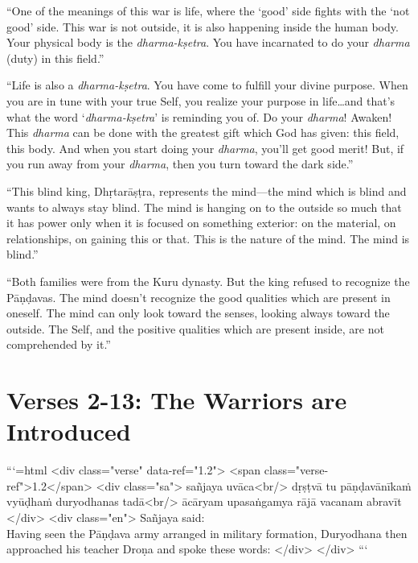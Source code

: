 \enquote{One of the meanings of this war is life, where the \enquote{good} side fights with the \enquote{not good} side. This war is not outside, it is also happening inside the human body. Your physical body is the \textit{dharma-kṣetra}. You have incarnated to do your \textit{dharma} (duty) in this field.}

\enquote{Life is also a \textit{dharma-kṣetra}. You have come to fulfill your divine purpose. When you are in tune with your true Self, you realize your purpose in life\ldots and that’s what the word \enquote{\textit{dharma-kṣetra}} is reminding you of. Do your \textit{dharma}! Awaken! This \textit{dharma} can be done with the greatest gift which God has given: this field, this body. And when you start doing your \textit{dharma}, you’ll get good merit! But, if you run away from your \textit{dharma}, then you turn toward the dark side.}

\enquote{This blind king, Dhṛtarāṣṭra, represents the mind---the mind which is blind and wants to always stay blind. The mind is hanging on to the outside so much that it has power only when it is focused on something exterior: on the material, on relationships, on gaining this or that. This is the nature of the mind. The mind is blind.}

\enquote{Both families were from the Kuru dynasty. But the king refused to recognize the Pāṇḍavas. The mind doesn’t recognize the good qualities which are present in oneself. The mind can only look toward the senses, looking always toward the outside. The Self, and the positive qualities which are present inside, are not comprehended by it.}

\section{Verses 2-13: The Warriors are Introduced}\label{sec-verses-2-13-the-warriors-are-introduced}



```{=html}
<div class="verse" data-ref="1.2">
  <span class="verse-ref">1.2</span>
  <div class="sa">
    sañjaya uvāca<br/>
    dṛṣṭvā tu pāṇḍavānīkaṁ vyūḍhaṁ duryodhanas tadā<br/>
    ācāryam upasaṅgamya rājā vacanam abravīt
  </div>
  <div class="en">
    \hspace*{1em}Sañjaya said: \\ Having seen the Pāṇḍava army arranged in military formation, Duryodhana then approached his teacher Droṇa and spoke these words:
  </div>
</div>
```




